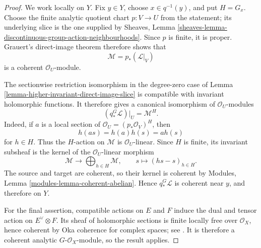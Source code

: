 \begin{proof}
We work locally on $Y$. Fix $y\in Y$, choose $x\in q^{-1}(y)$, and put
$H=G_x$. Choose the finite analytic quotient chart $p:V\to U$ from the
statement; its underlying slice is the one supplied by Sheaves, Lemma
\ref{sheaves-lemma-discontinuous-group-action-neighbourhoods}. Since $p$ is
finite, it is proper. Grauert's direct-image theorem therefore shows that
$$
\mathcal M=p_*(\mathcal L|_V)
$$
is a coherent $\mathcal O_U$-module.

The sectionwise restriction isomorphism in the degree-zero case of Lemma
\ref{lemma-higher-invariant-direct-image-slice} is compatible with invariant
holomorphic functions. It therefore gives a canonical isomorphism of
$\mathcal O_U$-modules
$$
(q_*^G\mathcal L)|_U=\mathcal M^H.
$$
Indeed, if $a$ is a local section of
$\mathcal O_U=(p_*\mathcal O_V)^H$, then
$$
h(as)=h(a)h(s)=a h(s)
$$
for $h\in H$. Thus the $H$-action on $\mathcal M$ is
$\mathcal O_U$-linear. Since $H$ is finite, its invariant subsheaf is the
kernel of the $\mathcal O_U$-linear morphism
$$
\mathcal M\longrightarrow\bigoplus_{h\in H}\mathcal M,
\qquad
s\longmapsto(hs-s)_{h\in H}.
$$
The source and target are coherent, so their kernel is coherent by Modules,
Lemma \ref{modules-lemma-coherent-abelian}. Hence $q_*^G\mathcal L$ is
coherent near $y$, and therefore on $Y$.

For the final assertion, compatible actions on $E$ and $F$ induce the dual
and tensor action on $E^\vee\otimes F$. Its sheaf of holomorphic sections is
finite locally free over $\mathcal O_X$, hence coherent by Oka coherence for
complex spaces; see \cite[p. 16]{Grauert-direct-image}. It is therefore a
coherent analytic $G$-$\mathcal O_X$-module, so the result applies.
\end{proof}
